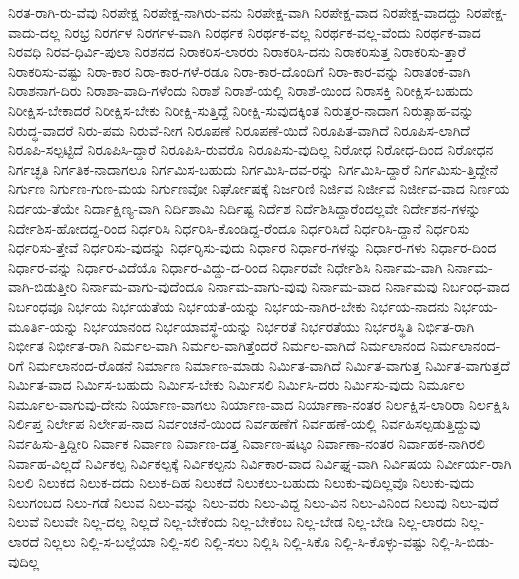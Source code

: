 {ನಿರತ-ರಾಗಿ-ರು-ವೆವು
ನಿರಪೇಕ್ಷ
ನಿರಪೇಕ್ಷ-ನಾಗಿರು-ವನು
ನಿರಪೇಕ್ಷ-ವಾಗಿ
ನಿರಪೇಕ್ಷ-ವಾದ
ನಿರಪೇಕ್ಷ-ವಾದದ್ದು
ನಿರಪೇಕ್ಷ-ವಾದು-ದಲ್ಲ
ನಿರಭ್ರ
ನಿರರ್ಗಳ
ನಿರರ್ಗಳ-ವಾಗಿ
ನಿರರ್ಥಕ
ನಿರರ್ಥಕ-ವಲ್ಲ
ನಿರರ್ಥಕ-ವಲ್ಲ-ವೆಂದು
ನಿರರ್ಥಕ-ವಾದ
ನಿರವಧಿ
ನಿರವ-ಧಿರ್ವಿ-ಪುಲಾ
ನಿರಶನದ
ನಿರಾಕರಿಸ-ಲಾರರು
ನಿರಾಕರಿಸಿ-ದನು
ನಿರಾಕರಿಸುತ್ತ
ನಿರಾಕರಿಸು-ತ್ತಾರೆ
ನಿರಾಕರಿಸು-ವಷ್ಟು
ನಿರಾ-ಕಾರ
ನಿರಾ-ಕಾರ-ಗಳೆ-ರಡೂ
ನಿರಾ-ಕಾರ-ದೊಂದಿಗೆ
ನಿರಾ-ಕಾರ-ವನ್ನು
ನಿರಾತಂಕ-ವಾಗಿ
ನಿರಾಶನಾಗ-ದಿರು
ನಿರಾಶಾ-ವಾದಿ-ಗಳೆಂದು
ನಿರಾಶೆ
ನಿರಾಶೆ-ಯಲ್ಲಿ
ನಿರಾಶೆ-ಯಿಂದ
ನಿರಾಸಕ್ತಿ
ನಿರೀಕ್ಷಿಸ-ಬಹುದು
ನಿರೀಕ್ಷಿಸ-ಬೇಕಾದರೆ
ನಿರೀಕ್ಷಿಸ-ಬೇಕು
ನಿರೀಕ್ಷಿ-ಸುತ್ತಿದ್ದೆ
ನಿರೀಕ್ಷಿ-ಸುವುದಕ್ಕಿಂತ
ನಿರುತ್ತರ-ನಾದಾಗ
ನಿರುತ್ಸಾಹ-ವನ್ನು
ನಿರುದ್ಧ-ವಾದರೆ
ನಿರು-ಪಮ
ನಿರುವೆ-ನೀಗ
ನಿರೂಪಣೆ
ನಿರೂಪಣೆ-ಯಿದೆ
ನಿರೂಪಿತ-ವಾಗಿದೆ
ನಿರೂಪಿಸ-ಲಾಗಿದೆ
ನಿರೂಪಿ-ಸಲ್ಪಟ್ಟಿದೆ
ನಿರೂಪಿಸಿ-ದ್ದಾರೆ
ನಿರೂಪಿಸಿ-ರುವರೊ
ನಿರೂಪಿಸು-ವುದಿಲ್ಲ
ನಿರೋಧ
ನಿರೋಧ-ದಿಂದ
ನಿರೋಧನ
ನಿರ್ಗಚ್ಛತಿ
ನಿರ್ಗತಿಕ-ನಾದಾಗಲೂ
ನಿರ್ಗಮಿಸ-ಬಹುದು
ನಿರ್ಗಮಿಸಿ-ದವ-ರನ್ನು
ನಿರ್ಗಮಿಸಿ-ದ್ದಾರೆ
ನಿರ್ಗಮಿಸು-ತ್ತಿದ್ದೇನೆ
ನಿರ್ಗುಣ
ನಿರ್ಗುಣ-ಗುಣ-ಮಯ
ನಿರ್ಗುಣವೋ
ನಿರ್ಘೋಷಕ್ಕೆ
ನಿರ್ಜರಿಣಿ
ನಿರ್ಜಿವ
ನಿರ್ಜೀವ
ನಿರ್ಜೀವ-ವಾದ
ನಿರ್ಣಯ
ನಿರ್ದಯ-ತೆಯೇ
ನಿರ್ದಾಕ್ಷಿಣ್ಯ-ವಾಗಿ
ನಿರ್ದಿಶಾಮಿ
ನಿರ್ದಿಷ್ಟ
ನಿರ್ದೆಶ
ನಿರ್ದೆಶಿಸಿದ್ದಾರೆಂದಲ್ಲವೇ
ನಿರ್ದೇಶನ-ಗಳನ್ನು
ನಿರ್ದೇಶಿಸ-ಹೋದದ್ದ-ರಿಂದ
ನಿರ್ಧರಿಸಿ
ನಿರ್ಧರಿಸಿ-ಕೊಂಡಿದ್ದ-ರೆಂದೂ
ನಿರ್ಧರಿಸಿದೆ
ನಿರ್ಧರಿಸಿ-ದ್ದಾನೆ
ನಿರ್ಧರಿಸು
ನಿರ್ಧರಿಸು-ತ್ತೇವೆ
ನಿರ್ಧರಿಸು-ವುದನ್ನು
ನಿರ್ಧರಿೃಸು-ವುದು
ನಿರ್ಧಾರ
ನಿರ್ಧಾರ-ಗಳನ್ನು
ನಿರ್ಧಾರ-ಗಳು
ನಿರ್ಧಾರ-ದಿಂದ
ನಿರ್ಧಾರ-ವನ್ನು
ನಿರ್ಧಾರ-ವಿದೆಯೊ
ನಿರ್ಧಾರ-ವಿದ್ದು-ದ-ರಿಂದ
ನಿರ್ಧಾರವೇ
ನಿರ್ಧೇಶಿಸಿ
ನಿರ್ನಾಮ-ವಾಗಿ
ನಿರ್ನಾಮ-ವಾಗಿ-ಬಿಡುತ್ತೀರಿ
ನಿರ್ನಾಮ-ವಾಗು-ವುದೆಂದೂ
ನಿರ್ನಾಮ-ವಾಗು-ವುವು
ನಿರ್ನಾಮ-ವಾದ
ನಿರ್ನಾಮವು
ನಿರ್ಬಂಧ-ವಾದ
ನಿರ್ಬಂಧವೂ
ನಿರ್ಭಯ
ನಿರ್ಭಯತೆಯ
ನಿರ್ಭಯತೆ-ಯನ್ನು
ನಿರ್ಭಯ-ನಾಗಿರ-ಬೇಕು
ನಿರ್ಭಯ-ನಾದನು
ನಿರ್ಭಯ-ಮೂರ್ತಿ-ಯನ್ನು
ನಿರ್ಭಯಾನಂದ
ನಿರ್ಭಯಾವಸ್ಥೆ-ಯನ್ನು
ನಿರ್ಭರತೆ
ನಿರ್ಭರತೆಯು
ನಿರ್ಭರಸ್ಥಿತಿ
ನಿರ್ಭಿತ-ರಾಗಿ
ನಿರ್ಭೀತ
ನಿರ್ಭೀತ-ರಾಗಿ
ನಿರ್ಮಲ-ವಾಗಿ
ನಿರ್ಮಲ-ವಾಗಿತ್ತೆಂದರೆ
ನಿರ್ಮಲ-ವಾಗಿದೆ
ನಿರ್ಮಲಾನಂದ
ನಿರ್ಮಲಾನಂದ-ರಿಗೆ
ನಿರ್ಮಲಾನಂದ-ರೊಡನೆ
ನಿರ್ಮಾಣ
ನಿರ್ಮಾಣ-ಮಾಡು
ನಿರ್ಮಿತ-ವಾಗಿದೆ
ನಿರ್ಮಿತ-ವಾಗುತ್ತ
ನಿರ್ಮಿತ-ವಾಗುತ್ತದೆ
ನಿರ್ಮಿತ-ವಾದ
ನಿರ್ಮಿಸ-ಬಹುದು
ನಿರ್ಮಿಸ-ಬೇಕು
ನಿರ್ಮಿಸಲಿ
ನಿರ್ಮಿಸಿ-ದರು
ನಿರ್ಮಿಸು-ವುದು
ನಿರ್ಮೂಲ
ನಿರ್ಮೂಲ-ವಾಗುವು-ದೇನು
ನಿರ್ಯಾಣ-ವಾಗಲು
ನಿರ್ಯಾಣ-ವಾದ
ನಿರ್ಯಾಣಾ-ನಂತರ
ನಿರ್ಲಕ್ಷಿಸ-ಲಾರಿರಾ
ನಿರ್ಲಕ್ಷಿಸಿ
ನಿರ್ಲಿಪ್ತ
ನಿರ್ಲೇಪ
ನಿರ್ಲೇಪ-ನಾದ
ನಿರ್ವಂಚನೆ-ಯಿಂದ
ನಿರ್ವಹಣೆಗೆ
ನಿರ್ವಹಣೆ-ಯಲ್ಲಿ
ನಿರ್ವಹಿಸಲ್ಪಡುತ್ತಿದ್ದುವು
ನಿರ್ವಹಿಸು-ತ್ತಿದ್ದೀರಿ
ನಿರ್ವಾಕ
ನಿರ್ವಾಣ
ನಿರ್ವಾಣ-ದತ್ತ
ನಿರ್ವಾಣ-ಷಟ್ಕಂ
ನಿರ್ವಾಣಾ-ನಂತರ
ನಿರ್ವಾಹಕ-ನಾಗಿರಲಿ
ನಿರ್ವಾಹ-ವಿಲ್ಲದೆ
ನಿರ್ವಿಕಲ್ಪ
ನಿರ್ವಿಕಲ್ಪಕ್ಕೆ
ನಿರ್ವಿಕಲ್ಪನು
ನಿರ್ವಿಕಾರ-ವಾದ
ನಿರ್ವಿಘ್ನ-ವಾಗಿ
ನಿರ್ವಿಷಯ
ನಿರ್ವೀರ್ಯ-ರಾಗಿ
ನಿಲಲಿ
ನಿಲುಕದ
ನಿಲುಕ-ದದು
ನಿಲುಕ-ದಿಹ
ನಿಲುಕದೆ
ನಿಲುಕಲು-ಬಹುದು
ನಿಲುಕು-ವುದಿಲ್ಲವೊ
ನಿಲುಕು-ವುದು
ನಿಲುಗಂಬದ
ನಿಲು-ಗಡೆ
ನಿಲುವ
ನಿಲು-ವನ್ನು
ನಿಲು-ವರು
ನಿಲು-ವಿದ್ದ
ನಿಲು-ವಿನ
ನಿಲು-ವಿನಿಂದ
ನಿಲುವು
ನಿಲು-ವುದೆ
ನಿಲುವೆ
ನಿಲುವೇ
ನಿಲ್ಲ-ದಲ್ಲ
ನಿಲ್ಲದೆ
ನಿಲ್ಲ-ಬೇಕೆಂದು
ನಿಲ್ಲ-ಬೇಕೆಂಬ
ನಿಲ್ಲ-ಬೇಡ
ನಿಲ್ಲ-ಬೇಡಿ
ನಿಲ್ಲ-ಲಾರದು
ನಿಲ್ಲ-ಲಾರದೆ
ನಿಲ್ಲಲು
ನಿಲ್ಲಿ-ಸ-ಬಲ್ಲೆಯಾ
ನಿಲ್ಲಿ-ಸಲಿ
ನಿಲ್ಲಿ-ಸಲು
ನಿಲ್ಲಿಸಿ
ನಿಲ್ಲಿ-ಸಿಕೊ
ನಿಲ್ಲಿ-ಸಿ-ಕೊಳ್ಳು-ವಷ್ಟು
ನಿಲ್ಲಿ-ಸಿ-ಬಿಡು-ವುದಿಲ್ಲ
}
